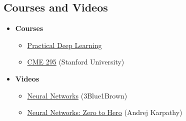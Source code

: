 \documentclass[../../../main.tex]{subfiles}
\begin{document}
\subsection*{Courses and Videos}
\vspace{-0.5\baselineskip}
\begin{itemize}[noitemsep]
\item \textbf{Courses}
\begin{itemize}[noitemsep]
\item
\href{https://course.fast.ai/}{Practical Deep Learning}
\item
\href{https://cme295.stanford.edu/syllabus/}{CME 295}
(Stanford University)
\end{itemize}

\item \textbf{Videos}
\begin{itemize}[noitemsep]
\item
\href{https://youtube.com/playlist?list=PLZHQObOWTQDNU6R1_67000Dx_ZCJB-3pi}{Neural Networks} (3Blue1Brown)
\item
\href{https://youtube.com/playlist?list=PLAqhIrjkxbuWI23v9cThsA9GvCAUhRvKZ}{Neural Networks: Zero to Hero} (Andrej Karpathy)
\end{itemize}
\end{itemize}
\end{document}
